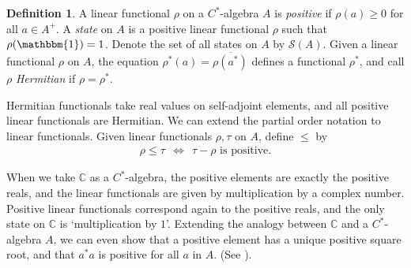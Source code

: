 \documentclass[11pt,a4paper]{report}
\theoremstyle{plain}
\theoremstyle{definition}
\newtheorem{defn}{Definition}
\newcommand{\1}{\mathbbm{1}}
\newcommand{\C}{\mathbb{C}}
\renewcommand{\S}{\mathscr{S}}
\renewcommand{\bar}{\overline}
\begin{document}
\begin{defn}
	A linear functional $\rho$ on a $C^\ast$-algebra $A$ is \emph{positive} if 
	$\rho(a)\geq 0$ for all $a\in A^+$. A \emph{state} on $A$ is a positive linear 
	functional $\rho$ such that $\rho(\1)=1$. Denote the set of all states on $A$ by 
	$\S(A)$. Given a linear functional $\rho$ on $A$, the equation $\rho^\ast(a) 
	=\bar{\rho(a^\ast)}$ defines a functional $\rho^\ast$, and call $\rho$ 
	\emph{Hermitian} if $\rho=\rho^\ast$.

\end{defn}
Hermitian functionals take real values on self-adjoint elements, and all 
positive linear functionals are Hermitian. We can extend the partial order 
notation to linear functionals. Given linear functionals $\rho,\tau$ on $A$, 
define $\leq$ by
\begin{align*}
	\rho \leq \tau ~~\iff~~ \tau - \rho \mbox{ is positive}.
\end{align*}

When we take $\C$ as a $C^\ast$-algebra, the positive elements are exactly the 
positive reals, and the linear functionals are given by multiplication by a 
complex number. Positive linear functionals correspond again to the positive 
reals, and the only state on $\C$ is `multiplication by $1$'.
Extending the analogy between $\C$ and a $C^\ast$-algebra $A$, we can even show 
that a positive element has a unique positive square root, and that $a^\ast a$ 
is positive for all $a$ in $A$. (See \cite[4.2.5 and 4.2.6]{kadison83}).
\end{document}

